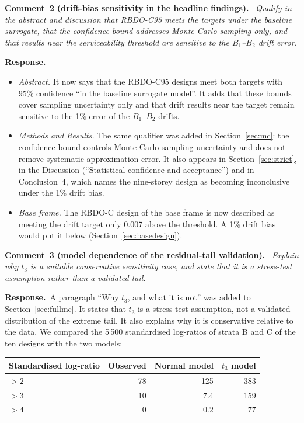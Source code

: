 \documentclass[11pt]{article}
\newenvironment{comment}[1]{\par\medskip\noindent\textbf{Comment~#1.}\ \itshape}{\par}
\newcommand{\resp}{\par\noindent\textbf{Response.}\ }
\begin{document}
\begin{comment}{2 (drift-bias sensitivity in the headline findings)}
Qualify in the abstract and discussion that RBDO-C95 meets the targets under the baseline surrogate,
that the confidence bound addresses Monte Carlo sampling only, and that results near the
serviceability threshold are sensitive to the $B_1$--$B_2$ drift error.
\end{comment}
\resp
\begin{itemize}[itemsep=0.1em]
\item \emph{Abstract.} It now says that the RBDO-C95 designs meet both targets with 95\% confidence
``in the baseline surrogate model''. It adds that these bounds cover sampling uncertainty only and that
drift results near the target remain sensitive to the 1\% error of the $B_1$--$B_2$ drifts.
\item \emph{Methods and Results.} The same qualifier was added in Section~\ref{sec:mc}: the confidence
bound controls Monte Carlo sampling uncertainty and does not remove systematic approximation error. It
also appears in Section~\ref{sec:strict}, in the Discussion (``Statistical confidence and acceptance'')
and in Conclusion~4, which names the nine-storey design as becoming inconclusive under the 1\% drift
bias.
\item \emph{Base frame.} The RBDO-C design of the base frame is now described as meeting the drift
target only 0.007 above the threshold. A 1\% drift bias would put it below
(Section~\ref{sec:basedesign}).
\end{itemize}

\begin{comment}{3 (model dependence of the residual-tail validation)}
Explain why $t_3$ is a suitable conservative sensitivity case, and state that it is a stress-test
assumption rather than a validated tail.
\end{comment}
\resp A paragraph ``Why $t_3$, and what it is not'' was added to Section~\ref{sec:fullmc}. It states
that $t_3$ is a stress-test assumption, not a validated distribution of the extreme tail. It also
explains why it is conservative relative to the data. We compared the 5\,500 standardised
log-ratios of strata B and C of the ten designs with the two models:

\begin{center}
\begin{tabular}{lrrr}
Standardised log-ratio & Observed & Normal model & $t_3$ model \\
\hline
$>2$ & 78 & 125 & 383 \\
$>3$ & 10 & 7.4 & 159 \\
$>4$ & 0 & 0.2 & 77 \\
\end{tabular}
\end{center}
\end{document}
